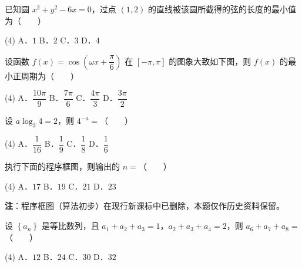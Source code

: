 \begin{question}
已知圆 $x^{2}+y^{2}-6x=0$，过点 $(1,2)$ 的直线被该圆所截得的弦的长度的最小值为\mbox{（　　）}

\begin{gkopts}(4)
\task A．$1$
\task B．$2$
\task C．$3$
\task D．$4$
\end{gkopts}

\Needspace{0.4\textheight}
\end{question}
\begin{question}
设函数 $f(x)=\cos\left(\omega x+\dfrac\pi6\right)$ 在 $[-\pi,\pi]$ 的图象大致如下图，则 $f(x)$ 的最小正周期为\mbox{（　　）}
\nopagebreak[4]
\begin{center}\end{center}
\nopagebreak[4]
\begin{gkopts}(4)
\task A．$\dfrac{10\pi}9$
\task B．$\dfrac{7\pi}6$
\task C．$\dfrac{4\pi}3$
\task D．$\dfrac{3\pi}2$
\end{gkopts}

\end{question}
\begin{question}
设 $a\log_3 4=2$，则 $4^{-a}=$\mbox{（　　）}

\begin{gkopts}(4)
\task A．$\dfrac1{16}$
\task B．$\dfrac19$
\task C．$\dfrac18$
\task D．$\dfrac16$
\end{gkopts}

\Needspace{0.4\textheight}
\end{question}
\begin{question}
执行下面的程序框图，则输出的 $n=$\mbox{（　　）}
\nopagebreak[4]
\begin{center}\end{center}
\nopagebreak[4]
\begin{gkopts}(4)
\task A．$17$
\task B．$19$
\task C．$21$
\task D．$23$
\end{gkopts}

\begin{gktip}
\textbf{注}：程序框图（算法初步）在现行新课标中已删除，本题仅作历史资料保留。
\end{gktip}

\end{question}
\begin{question}
设 $\left\{a_n\right\}$ 是等比数列，且 $a_1+a_2+a_3=1$，$a_2+a_3+a_4=2$，则 $a_6+a_7+a_8=$\mbox{（　　）}

\begin{gkopts}(4)
\task A．$12$
\task B．$24$
\task C．$30$
\task D．$32$
\end{gkopts}

\end{question}
